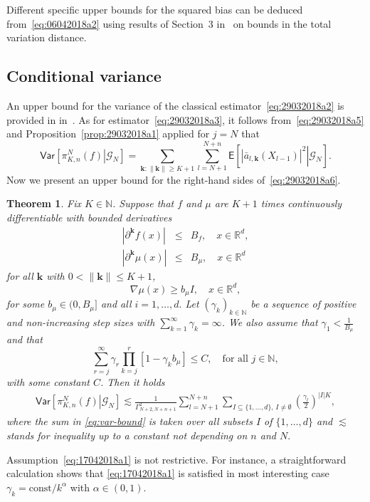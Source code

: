 \documentclass[article]{elsarticle}
\newtheorem{thm}{Theorem}
\newcommand*{\const}{\mathrm{const}}
\begin{document}
Different specific upper bounds for the squared bias
can be deduced from~\eqref{eq:06042018a2}
using results of Section~3 in~\cite{durmus:moulines:2017}
on bounds in the total variation distance.






\subsection{Conditional variance}
An upper bound for the variance of the classical estimator~\eqref{eq:29032018a2}
is provided in  in~\cite[Theorem~17]{durmus:moulines:2017}.
As for estimator~\eqref{eq:29032018a3},
it follows from~\eqref{eq:29032018a5}
and Proposition~\ref{prop:29032018a1}
applied for $j=N$ that
\begin{equation}\label{eq:29032018a6}
\mathsf{Var}\left[\left.\pi_{K,n}^{N}(f)\right|\mathcal G_N\right]
=\sum_{\mathbf k\colon \|\mathbf k\|\ge K+1}
\sum_{l=N+1}^{N+n}
\mathsf{E}\left[\left.\left|\bar a_{l,\mathbf{k}}(X_{l-1})\right|^{2}
\right|\mathcal G_N\right].
\end{equation}
Now we present an upper bound for the right-hand sides of~\eqref{eq:29032018a6}.
\begin{thm}\label{th:mr}
Fix $K\in\mathbb N$.
Suppose that $f$  and \(\mu\) are \(K+1\) times continuously differentiable
with bounded derivatives
\begin{eqnarray*}
|\partial^{\mathbf{k}} f(x)|&\le & B_f,\quad
x\in\mathbb R^d,
\\
|\partial^{\mathbf{k}}\mu(x)|&\le & B_\mu,\quad
x\in\mathbb R^d
\end{eqnarray*}
for all \(\mathbf{k}\) with \(0<\|\mathbf{k}\|\leq  K+1\),
\[
\nabla\mu(x)\ge b_\mu I ,\quad x\in\mathbb R^d,
\]
for some $b_\mu\in(0,B_\mu]$ and all \(i=1,\ldots, d.\)
Let $(\gamma_k)_{k\in\mathbb N}$ be a sequence of positive
and non-increasing step sizes with $\sum_{k=1}^\infty \gamma_k=\infty$.
We also assume that $\gamma_1<\frac1{B_\mu}$ and that
\begin{equation}\label{eq:17042018a1}
\sum_{r=j}^\infty \gamma_r\prod_{k=j}^{r}\left[1-\gamma_{k}b_\mu\right]\leq C,\quad\text{for all }j\in\mathbb N,
\end{equation}
with some constant \(C\). Then it holds
\begin{eqnarray}
\label{eq:var-bound}
\mathsf{Var}\left[\left.\pi_{K,n}^{N}(f)\right|\mathcal G_N\right]\lesssim \frac{1}{\Gamma^2_{N+2,N+n+1}}\sum_{l=N+1}^{N+n}\sum_{I\subseteq\{1,\ldots,d\},\, I\neq \emptyset}
\left(\frac{\gamma_{l}}{2}\right)^{|I|K},
\end{eqnarray}
where the sum in \eqref{eq:var-bound} is taken over all subsets \(I\) of \(\{1,\ldots,d\}\) and \(\lesssim\) stands for inequality up to a constant not depending  on \(n\) and \(N.\)
\end{thm}
\begin{remark}
Assumption~\eqref{eq:17042018a1} is not restrictive.
For instance, a straightforward calculation shows
that \eqref{eq:17042018a1} is satisfied in most interesting case
$\gamma_k=\const/k^\alpha$ with $\alpha\in (0,1)$.
\end{remark}
\end{document}
